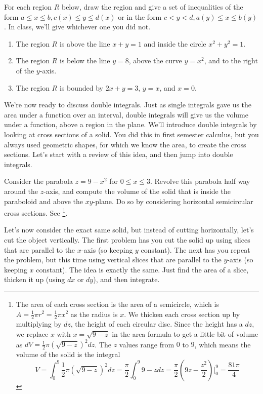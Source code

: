 \begin{problem}
For each region $R$ below, draw the region and give a set of inequalities of the form $a\leq x\leq b, c(x)\leq y\leq d(x)$ or in the form $c<y<d, a(y)\leq x\leq b(y)$. In class, we'll give whichever one you did not. 
\begin{enumerate}
 \item The region $R$ is above the line $x+y=1$ and inside the circle $x^2+y^2=1$.
 \item The region $R$ is below the line $y=8$, above the curve $y=x^2$, and to the right of the $y$-axis.
 \item The region $R$ is bounded by $2x+y=3$, $y=x$, and $x=0$. 
\end{enumerate}
\end{problem}

We're now ready to discuss double integrals. Just as single integrals gave us the area under a function over an interval, double integrals will give us the volume under a function, above a region in the plane.  We'll introduce double integrals by looking at cross sections of a solid.  You did this in first semester calculus, but you always used geometric shapes, for which we know the area, to create the cross sections.  Let's start with a review of this idea, and then jump into double integrals.




\begin{review*}
 Consider the parabola $z=9-x^2$ for $0\leq x\leq 3$. Revolve this parabola half way around the $z$-axis, and compute the volume of the solid that is inside the paraboloid and above the $xy$-plane.  Do so by considering horizontal semicircular cross sections. See \footnote{
The area of each cross section is the area of a semicircle, which is $A=\frac{1}{2}\pi r^2 = \frac12 \pi x^2$ as the radius is $x$. We thicken each cross section up by multiplying by $dz$, the height of each circular disc. Since the height has a $dz$, we replace $x$ with $x=\sqrt{9-z}$ in the area formula to get a little bit of volume as $dV = \frac{1}{2}\pi (\sqrt{9-z})^2 dz$.  The $z$ values range from $0$ to $9$, which means the volume of the solid is the integral 
$$V
=\int_0^9 \frac{1}{2}\pi (\sqrt{9-z})^2 dz
=\frac{\pi}{2}\int_0^9  9-z dz
=\frac{\pi}{2}  \left(9z-\frac{z^2}{2}\right)\bigg|_0^9
=\frac{81\pi}{4}
$$}.
\end{review*}



Let's now consider the exact same solid, but instead of cutting horizontally, let's cut the object vertically.  The first problem has you cut the solid up using slices that are parallel to the $x$-axis (so keeping $y$ constant).  The next has you repeat the problem, but this time using vertical slices that are parallel to the $y$-axis (so keeping $x$ constant).  The idea is exactly the same.  Just find the area of a slice, thicken it up (using $dx$ or $dy$), and then integrate.  



